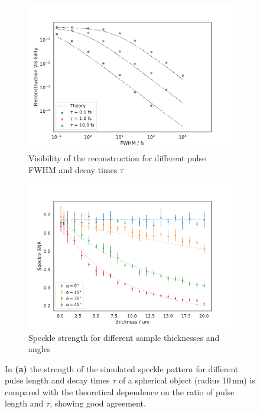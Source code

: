 \begin{figure}
\begin{subfigure}[b]{0.45\textwidth}
		\centering
		\includegraphics[width=\linewidth]{images/timedependent_2.pdf}
		\caption{Visibility of the reconstruction for different pulse FWHM and decay times $\tau$}
	\end{subfigure}
	\hspace{0.1cm}
	\begin{subfigure}[b]{0.45\textwidth}
		\includegraphics[width=\linewidth]{images/thickness.pdf}
		\caption{Speckle strength for different sample thicknesses and angles}
		\label{fig:thickness}
	\end{subfigure}	
	\caption[Speckle Strength and Signal Visibility in Time Dependent Simulation]{ In \textbf{(a)} the strength of the simulated speckle pattern for different pulse length and decay times $\tau$ of a spherical object (radius 10\,nm) is compared with the theoretical dependence on the ratio of pulse length and $\tau$, showing good agreement. 
}
\end{figure}

